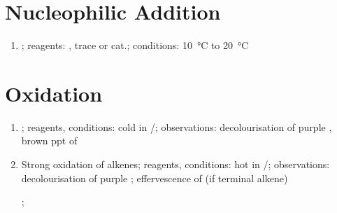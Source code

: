 \section{Nucleophilic Addition}
\begin{enumerate}
    \item {}; reagents: , trace  or  cat.; conditions: \SI{10}{\celsius} to \SI{20}{\celsius}
\end{enumerate}
\section{Oxidation}
\begin{enumerate}
    \item {}; reagents, conditions: cold  in /; observations: decolourisation of purple , brown ppt of 
    \item Strong oxidation of alkenes; reagents, conditions: hot  in /; observations: decolourisation of purple ; effervescence of  (if terminal alkene)
    
    ; 
    

\end{enumerate}
